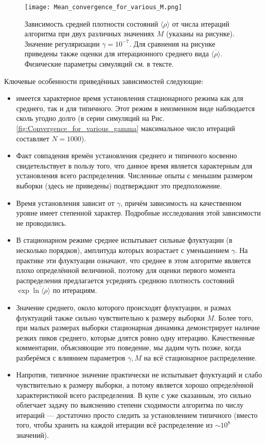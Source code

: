 \begin{figure}[h!p]
	\label{fig:Mean_convergence_for_various_M}
	\centering
	\texttt{[image: Mean\_convergence\_for\_various\_M.png]}
	\caption{Зависимость средней плотности состояний $\langle \rho \rangle$ от числа итераций алгоритма при двух различных значениях $M$ (указаны на рисунке). Значение регуляризации $\gamma = 10^{-7}$. Для сравнения на рисунке приведены также оценки для итерационного среднего вида $\overline{\langle \rho \rangle}$. Физические параметры симуляций см. в тексте.}
\end{figure}

Ключевые особенности приведённых зависимостей следующие:
\begin{itemize}
	\item имеется характерное время установления стационарного режима как для среднего, так и для типичного. Этот режим в неизменном виде наблюдается сколь угодно долго (в серии симуляций на Рис. \ref{fig:Convergence_for_various_gamma} максимальное число итераций составляет $N = 1000$).
	\item Факт совпадения времён установления среднего и типичного косвенно свидетельствует в пользу того, что данное время является характерным для установления всего распределения. Численные опыты с меньшим размером выборки (здесь не приведены) подтверждают это предположение.
	\item Время установления зависит от $\gamma$, причём зависимость на качественном уровне имеет степенной характер. Подробные исследования этой зависимости не проводились.
	\item В стационарном режиме среднее испытывает сильные флуктуации (в несколько порядков), амплитуда которых возрастает с уменьшением $\gamma$. На практике эти флуктуации означают, что среднее в этом алгоритме является плохо определённой величиной, поэтому для оценки первого момента распределения предлагается усреднять среднюю плотность состояний $\exp \overline{\ln \langle \rho \rangle}$ по итерациям.
	\item Значение среднего, около которого происходят флуктуации, и размах флуктуаций также сильно чувствительно к размеру выборки $M$. Более того, при малых размерах выборки стационарная динамика демонстрирует наличие резких пиков среднего, которые длятся ровно одну итерацию. Качественные комментарии, объясняющие это поведение, мы дадим чуть позже, когда разберёмся с влиянием параметров $\gamma, M$ на всё стационарное распределение.
	\item Напротив, типичное значение практически не испытывает флуктуаций и слабо чувствительно к размеру выборки, а потому является хорошо определённой характеристикой всего распределения. В купе с уже сказанным, это сильно облегчает задачу по выяснению степени сходимости алгоритма по числу итераций --- достаточно просто следить за установлением типичного (вместо того, чтобы хранить на каждой итерации всё распределение из $\sim 10^8$ значений). 

\end{itemize}
